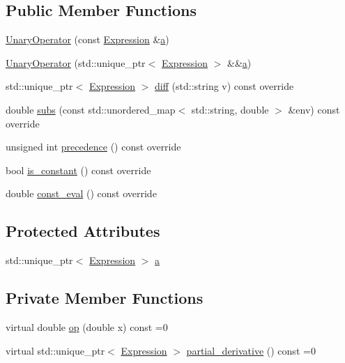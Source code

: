 \subsection*{Public Member Functions}
\begin{DoxyCompactItemize}
\item 
\hyperlink{classsymcpp_1_1UnaryOperator_a23a8172db96675ebf1114f4f3f41b6f1}{Unary\+Operator} (const \hyperlink{classsymcpp_1_1Expression}{Expression} \&\hyperlink{classsymcpp_1_1UnaryOperator_a1558842963261562d2ef68e324822cba}{a})
\item 
\hyperlink{classsymcpp_1_1UnaryOperator_ad3aa899567a080eeb41cb850de310178}{Unary\+Operator} (std\+::unique\+\_\+ptr$<$ \hyperlink{classsymcpp_1_1Expression}{Expression} $>$ \&\&\hyperlink{classsymcpp_1_1UnaryOperator_a1558842963261562d2ef68e324822cba}{a})
\item 
std\+::unique\+\_\+ptr$<$ \hyperlink{classsymcpp_1_1Expression}{Expression} $>$ \hyperlink{classsymcpp_1_1UnaryOperator_a73f6af837c67e65504e4bb82111d9557}{diff} (std\+::string v) const override
\item 
double \hyperlink{classsymcpp_1_1UnaryOperator_aa2296c73f9ca24a739fb8c3ff246fe0e}{subs} (const std\+::unordered\+\_\+map$<$ std\+::string, double $>$ \&env) const override
\item 
unsigned int \hyperlink{classsymcpp_1_1UnaryOperator_a129a9c47390abceff31da35d7b847329}{precedence} () const override
\item 
bool \hyperlink{classsymcpp_1_1UnaryOperator_abb499ba635a63dfa605fc3639509ac1c}{is\+\_\+constant} () const override
\item 
double \hyperlink{classsymcpp_1_1UnaryOperator_ae44aa26276abde61e16be12814075d0a}{const\+\_\+eval} () const override
\end{DoxyCompactItemize}
\subsection*{Protected Attributes}
\begin{DoxyCompactItemize}
\item 
std\+::unique\+\_\+ptr$<$ \hyperlink{classsymcpp_1_1Expression}{Expression} $>$ \hyperlink{classsymcpp_1_1UnaryOperator_a1558842963261562d2ef68e324822cba}{a}
\end{DoxyCompactItemize}
\subsection*{Private Member Functions}
\begin{DoxyCompactItemize}
\item 
virtual double \hyperlink{classsymcpp_1_1UnaryOperator_a679c3c46cad3a62bdd776ff836c7891e}{op} (double x) const =0
\item 
virtual std\+::unique\+\_\+ptr$<$ \hyperlink{classsymcpp_1_1Expression}{Expression} $>$ \hyperlink{classsymcpp_1_1UnaryOperator_a85de3214870cd72edc63ac1c221ddeee}{partial\+\_\+derivative} () const =0
\end{DoxyCompactItemize}


